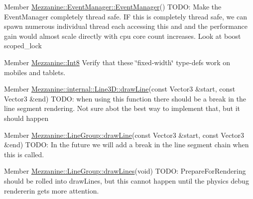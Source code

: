 \label{todo__todo000011}
\hypertarget{todo__todo000011}{}
 
\begin{DoxyDescription}
\item[Member \hyperlink{classMezzanine_1_1EventManager_a95ce9d2d865b0d8d9468448969b0ade2}{Mezzanine::EventManager::EventManager}() ]TODO: Make the EventManager completely thread safe. IF this is completely thread safe, we can spawn numerous individual thread each accessing this and and the performance gain would almost scale directly with cpu core count increases. Look at boost scoped\_\-lock 
\end{DoxyDescription}

\label{todo__todo000010}
\hypertarget{todo__todo000010}{}
 
\begin{DoxyDescription}
\item[Member \hyperlink{namespaceMezzanine_acbb048ee99aa07566d5a6eb33f5a2c2d}{Mezzanine::Int8} ]Verify that these \char`\"{}fixed-\/width\char`\"{} type-\/defs work on mobiles and tablets.


\end{DoxyDescription}

\label{todo__todo000013}
\hypertarget{todo__todo000013}{}
 
\begin{DoxyDescription}
\item[Member \hyperlink{classMezzanine_1_1internal_1_1Line3D_a17264ad5672bef8807ce6b4a8366e573}{Mezzanine::internal::Line3D::drawLine}(const Vector3 \&start, const Vector3 \&end) ]TODO: when using this function there should be a break in the line segment rendering. Not sure abot the best way to implement that, but it should happen 
\end{DoxyDescription}

\label{todo__todo000015}
\hypertarget{todo__todo000015}{}
 
\begin{DoxyDescription}
\item[Member \hyperlink{classMezzanine_1_1LineGroup_acadb6f8ccbe70828b094f07a11f276ac}{Mezzanine::LineGroup::drawLine}(const Vector3 \&start, const Vector3 \&end) ]TODO: In the future we will add a break in the line segment chain when this is called. 
\end{DoxyDescription}

\label{todo__todo000016}
\hypertarget{todo__todo000016}{}
 
\begin{DoxyDescription}
\item[Member \hyperlink{classMezzanine_1_1LineGroup_a85da1685525915f1e07d685b98f79f23}{Mezzanine::LineGroup::drawLines}(void) ]TODO: PrepareForRendering should be rolled into drawLines, but this cannot happen until the physics debug rendererin gets more attention. 
\end{DoxyDescription}

